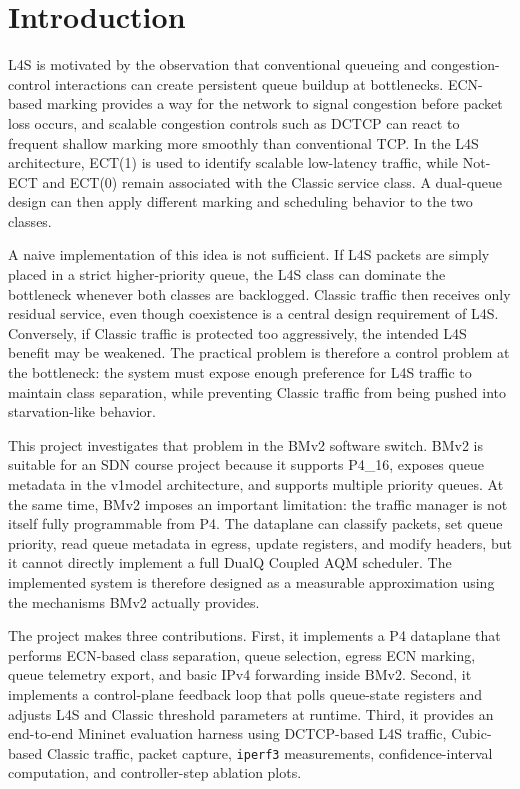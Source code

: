 \documentclass[10pt]{article}
\begin{document}
\section{Introduction}

L4S is motivated by the observation that conventional queueing and congestion-control interactions can create persistent queue buildup at bottlenecks. ECN-based marking provides a way for the network to signal congestion before packet loss occurs, and scalable congestion controls such as DCTCP can react to frequent shallow marking more smoothly than conventional TCP. In the L4S architecture, ECT(1) is used to identify scalable low-latency traffic, while Not-ECT and ECT(0) remain associated with the Classic service class. A dual-queue design can then apply different marking and scheduling behavior to the two classes.

A naive implementation of this idea is not sufficient. If L4S packets are simply placed in a strict higher-priority queue, the L4S class can dominate the bottleneck whenever both classes are backlogged. Classic traffic then receives only residual service, even though coexistence is a central design requirement of L4S. Conversely, if Classic traffic is protected too aggressively, the intended L4S benefit may be weakened. The practical problem is therefore a control problem at the bottleneck: the system must expose enough preference for L4S traffic to maintain class separation, while preventing Classic traffic from being pushed into starvation-like behavior.

This project investigates that problem in the BMv2 software switch. BMv2 is suitable for an SDN course project because it supports P4\_16, exposes queue metadata in the v1model architecture, and supports multiple priority queues. At the same time, BMv2 imposes an important limitation: the traffic manager is not itself fully programmable from P4. The dataplane can classify packets, set queue priority, read queue metadata in egress, update registers, and modify headers, but it cannot directly implement a full DualQ Coupled AQM scheduler. The implemented system is therefore designed as a measurable approximation using the mechanisms BMv2 actually provides.

The project makes three contributions. First, it implements a P4 dataplane that performs ECN-based class separation, queue selection, egress ECN marking, queue telemetry export, and basic IPv4 forwarding inside BMv2. Second, it implements a control-plane feedback loop that polls queue-state registers and adjusts L4S and Classic threshold parameters at runtime. Third, it provides an end-to-end Mininet evaluation harness using DCTCP-based L4S traffic, Cubic-based Classic traffic, packet capture, \texttt{iperf3} measurements, confidence-interval computation, and controller-step ablation plots.
\end{document}
